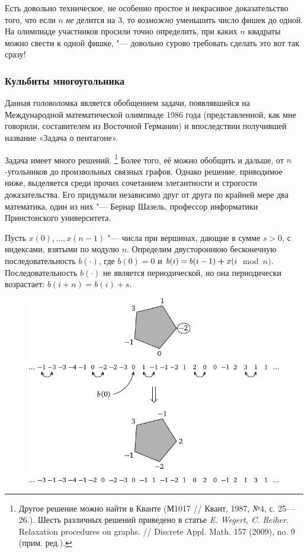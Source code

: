 \documentclass[twoside]{book}
\begin{document}
Есть довольно техническое, не особенно простое и некрасивое 
доказательство того, что если $n$ \emph{не} делится на $3$, то \emph{возможно} уменьшить число фишек до одной.
На олимпиаде участников просили точно определить, при каких $n$ квадраты можно свести к одной фишке, "--- довольно сурово требовать сделать это вот так сразу!

\subsubsection*{Кульбиты многоугольника}%

Данная головоломка является обобщением задачи, появлявшейся на Международной математической олимпиаде 1986 года (представленной, как мне говорили, составителем из Восточной Германии) и впоследствии получившей название «Задача о пентагоне».

Задача имеет много решений.
\footnote{Другое решение можно найти в Кванте (М1017 /\!/ Квант, 1987, №4, с. 25---26.).
Шесть различных решений приведено в статье \emph{E. Wegert, C. Reiher}. Relaxation procedures on graphs. /\!/ Discrete Appl. Math. 157 (2009), no. 9 (прим. ред.).}
Более того, её можно обобщить и дальше, от $n$-угольников до произвольных связных графов.
Однако решение, приводимое ниже, выделяется среди прочих сочетанием элегантности и строгости доказательства.
Его придумали независимо друг от друга по крайней мере два математика, один из них "--- Бернар Шазель, профессор информатики Принстонского университета. %

\medskip

Пусть $x(0),\dots,x(n-1)$ "--- числа при вершинах, дающие в сумме $s > 0$, с индексами, взятыми по модулю $n$.
Определим двустороннюю бесконечную последовательность
$b(\cdot)$, где $b(0) = 0$ и $b(i) = b(i -1) \hm+ x(i$~mod~${n})$.
Последовательность $b(\cdot)$ не является периодической, но она периодически возрастает: $b(i + n) = b(i) + s$.

\begin{figure}
\centering
\includegraphics{mp/wink-200}
\end{figure}
\end{document}
